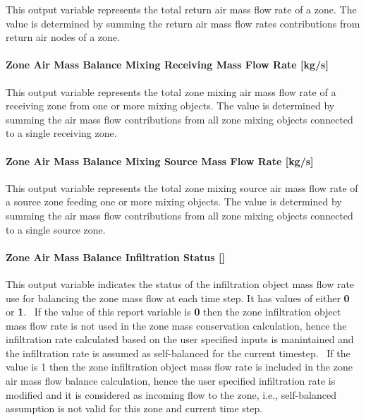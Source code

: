 This output variable represents the total return air mass flow rate of a zone. The value is determined by summing the return air mass flow rates contributions from return air nodes of a zone.

\paragraph{Zone Air Mass Balance Mixing Receiving Mass Flow Rate {[}kg/s{]}}\label{zone-air-mass-balance-mixing-receiving-mass-flow-rate-kgs}

This output variable represents the total zone mixing air mass flow rate of a receiving zone from one or more mixing objects. The value is determined by summing the air mass flow contributions from all zone mixing objects connected to a single receiving zone.

\paragraph{Zone Air Mass Balance Mixing Source Mass Flow Rate {[}kg/s{]}}\label{zone-air-mass-balance-mixing-source-mass-flow-rate-kgs}

This output variable represents the total zone mixing source air mass flow rate of a source zone feeding one or more mixing objects. The value is determined by summing the air mass flow contributions from all zone mixing objects connected to a single source zone.

\paragraph{Zone Air Mass Balance Infiltration Status {[]}}\label{zone-air-mass-balance-infiltration-status}

This output variable indicates the status of the infiltration object mass flow rate use for balancing the zone mass flow at each time step. It has values of either \textbf{0} or \textbf{1}.~ If the value of this report variable is \textbf{0} then the zone infiltration object mass flow rate is not used in the zone mass conservation calculation, hence the infiltration rate calculated based on the user specified inputs is manintained and the infiltration rate is assumed as self-balanced for the current timestep.~ If the value is 1 then the zone infiltration object mass flow rate is included in the zone air mass flow balance calculation, hence the user specified infiltration rate is modified and it is considered as incoming flow to the zone, i.e., self-balanced assumption is not valid for this zone and current time step.

